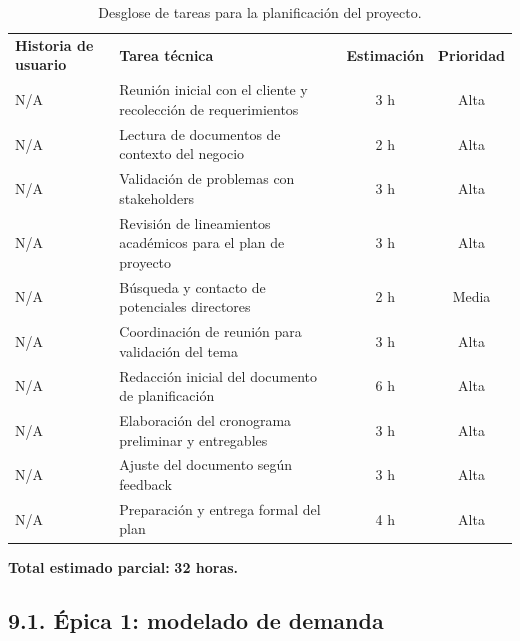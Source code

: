 \documentclass[
11pt, %
]{charter}
\begin{document}
\begin{table}[H]
\centering
\begin{tabular}{|l|p{6cm}|c|c|}
\hline
\textbf{Historia de usuario} & \textbf{Tarea técnica} & \textbf{Estimación} & \textbf{Prioridad} \\
N/A & Reunión inicial con el cliente y recolección de requerimientos & 3 h & Alta \\
N/A & Lectura de documentos de contexto del negocio & 2 h & Alta \\
N/A & Validación de problemas con stakeholders & 3 h & Alta \\
N/A & Revisión de lineamientos académicos para el plan de proyecto & 3 h & Alta \\
N/A & Búsqueda y contacto de potenciales directores & 2 h & Media \\
N/A & Coordinación de reunión para validación del tema & 3 h & Alta \\
N/A & Redacción inicial del documento de planificación & 6 h & Alta \\
N/A & Elaboración del cronograma preliminar y entregables & 3 h & Alta \\
N/A & Ajuste del documento según feedback & 3 h & Alta \\
N/A & Preparación y entrega formal del plan & 4 h & Alta \\
\hline
\end{tabular}
\caption{Desglose de tareas para la planificación del proyecto.}
\end{table}

\vspace{0.5cm}
\noindent
\textbf{Total estimado parcial:} \textbf{32 horas.}

\subsection*{9.1. Épica 1: modelado de demanda}
\end{document}
